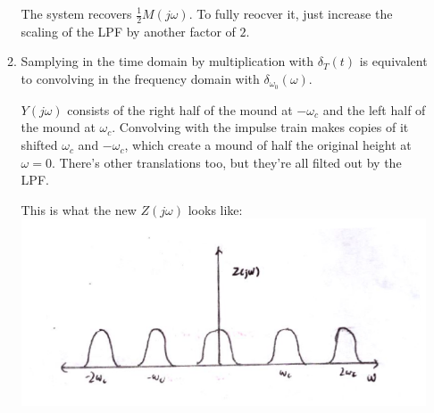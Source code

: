 \documentclass[12pt]{article}
\begin{document}
\begin{enumerate}
\begin{enumerate}
                        The system recovers $\frac{1}{2}M(j\omega)$.
                        To fully reocver it, just increase the scaling
                        of the LPF by another factor of $2$.
                  \item Samplying in the time domain by multiplication with $\delta_T(t)$
                        is equivalent to convolving in the frequency domain with $\delta_{\omega_0}(\omega)$.

                        $Y(j\omega)$ consists of the right half of the mound at $-\omega_c$
                        and the left half of the mound at $\omega_c$.
                        Convolving with the impulse train makes copies of it
                        shifted $\omega_c$ and $-\omega_c$, which create a mound
                        of half the original height at $\omega=0$.
                        There's other translations too, but they're all filted
                        out by the LPF.

                        This is what the new $Z(j\omega)$ looks like: \\
                        \includegraphics[width=12cm]{img/hw6/sampled_z}
            \end{enumerate}
\end{enumerate}
\end{document}
